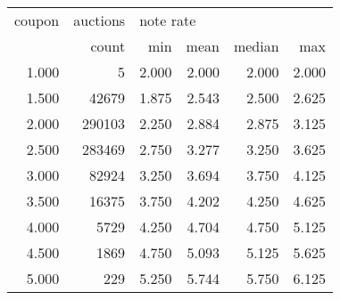 \begin{tabular}{rrrrrr}
\toprule
coupon & auctions & \multicolumn{4}{l}{note rate} \\
       &    count &       min &  mean & median &   max \\
\midrule
 1.000 &        5 &     2.000 & 2.000 &  2.000 & 2.000 \\
 1.500 &    42679 &     1.875 & 2.543 &  2.500 & 2.625 \\
 2.000 &   290103 &     2.250 & 2.884 &  2.875 & 3.125 \\
 2.500 &   283469 &     2.750 & 3.277 &  3.250 & 3.625 \\
 3.000 &    82924 &     3.250 & 3.694 &  3.750 & 4.125 \\
 3.500 &    16375 &     3.750 & 4.202 &  4.250 & 4.625 \\
 4.000 &     5729 &     4.250 & 4.704 &  4.750 & 5.125 \\
 4.500 &     1869 &     4.750 & 5.093 &  5.125 & 5.625 \\
 5.000 &      229 &     5.250 & 5.744 &  5.750 & 6.125 \\
\bottomrule
\end{tabular}

